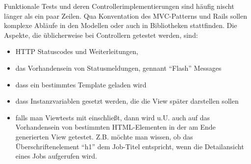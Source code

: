 Funktionale Tests und deren Controllerimplementierungen sind häufig nischt länger als ein paar Zeilen. Qua Konventation des MVC-Patterns und Rails sollen komplexe Abläufe in den Modellen oder auch in Bibliotheken stattfinden. 
Die Aspekte, die üblicherweise bei Controllern getestet werden, sind:
\begin{itemize}
 \item HTTP Statuscodes und Weiterleitungen,
 \item das Vorhandensein von Statusmeldungen, gennant "`Flash"' Messages
 \item dass ein bestimmtes Template geladen wird
 \item dass Instanzvariablen gesetzt werden, die die View später darstellen sollen
 \item falls man Viewtests mit einschließt, dann wird u.U. auch auf das Vorhandensein von bestimmten HTML-Elementen in der am Ende generierten View getestet. Z.B. möchte man wissen, ob das Überschriftenelement "`h1"' dem Job-Titel entspricht, wenn die Detailansicht eines Jobs aufgerufen wird.
\end{itemize}